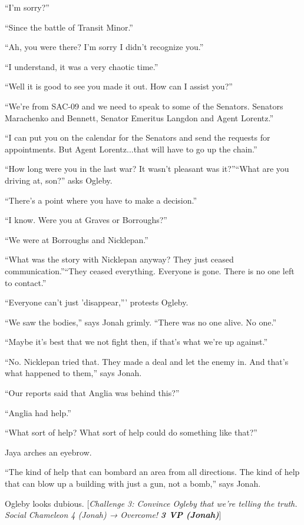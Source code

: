 ``I'm sorry?''

``Since the battle of Transit Minor.'' 

``Ah, you were there?  I'm sorry I didn't recognize you.''

``I understand, it was a very chaotic time.''

``Well it is good to see you made it out.  How can I assist you?''

``We're from SAC-09 and we need to speak to some of the Senators.  Senators Marachenko and Bennett, Senator Emeritus Langdon and Agent Lorentz.''

``I can put you on the calendar for the Senators and send the requests for appointments.  But Agent Lorentz...that will have to go up the chain.''

``How long were you in the last war?  It wasn't pleasant was it?''``What are you driving at, son?'' asks Ogleby.

``There's a point where you have to make a decision.''

``I know.  Were you at Graves or Borroughs?''

``We were at Borroughs and Nicklepan.''

``What was the story with Nicklepan anyway?  They just ceased communication.''``They ceased everything.  Everyone is gone.  There is no one left to contact.''

``Everyone can't just 'disappear,''' protests Ogleby.

``We saw the bodies,'' says Jonah grimly. ``There was no one alive.  No one.''

``Maybe it's best that we not fight then, if that's what we're up against.''

``No.  Nicklepan tried that.  They made a deal and let the enemy in.  And that's what happened to them,'' says Jonah.

``Our reports said that Anglia was behind this?''

``Anglia had help.''

``What sort of help?  What sort of help could do something like that?''

Jaya arches an eyebrow.

``The kind of help that can bombard an area from all directions.  The kind of help that can blow up a building with just a gun, not a bomb,'' says Jonah.

Ogleby looks dubious.  {[}\textit{Challenge 3: Convince Ogleby that we're telling the truth. Social Chameleon 4 (Jonah) → Overcome! }\textit{\textbf{3 VP (Jonah)}}{]} 



